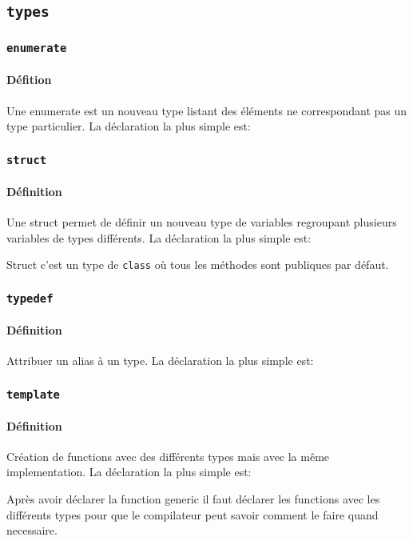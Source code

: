 \documentclass{article}
\begin{document}
\subsection{\texttt{types}}
\subsubsection{\texttt{enumerate}}
\paragraph{Défition}Une enumerate est un nouveau type listant des éléments ne correspondant pas un type particulier. La déclaration la plus simple est:
\begin{scriptsize}
    \mycode
\end{scriptsize}

\subsubsection{\texttt{struct}}
\paragraph{Définition}Une struct permet de définir un nouveau type de variables regroupant plusieurs variables de types différents. La déclaration la plus simple est:
\begin{scriptsize}
    \mycode
\end{scriptsize}
Struct c'est un type de \texttt{class} où tous les méthodes sont publiques par défaut.

\subsubsection{\texttt{typedef}}
\paragraph{Définition}Attribuer un alias à un type. La déclaration la plus simple est:
\begin{scriptsize}
    \mycode
\end{scriptsize}

\subsubsection{\texttt{template}}
\paragraph{Définition}Création de functions avec des différents types mais avec la même implementation. La déclaration la plus simple est:
\begin{scriptsize}
    \mycode
\end{scriptsize}
Après avoir déclarer la function generic il faut déclarer les functions avec les différents types pour que le compilateur peut savoir comment le faire quand necessaire.
\end{document}
